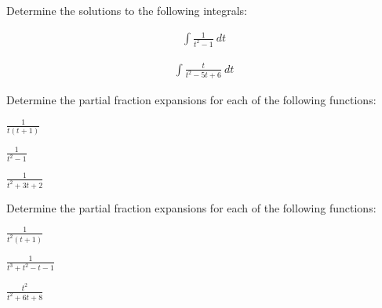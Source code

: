 

\begin{problem}
\item Determine the solutions to the following integrals:

  \begin{subproblem}
  \item 
    \begin{eqnarray*}
      \int \frac{1}{t^2-1} ~ dt 
    \end{eqnarray*}
    \vfill

  \item 
    \begin{eqnarray*}
      \int \frac{t}{t^2-5t+6} ~ dt
    \end{eqnarray*}
    \vfill

  \end{subproblem}
\end{problem}


\begin{problem}
\item Determine the partial fraction expansions for each of the following functions:

  \begin{subproblem}
  \item $\frac{1}{t(t+1)}$
    \vfill
  \item $\frac{1}{t^2-1}$
    \vfill
  \item $\frac{1}{t^2+3t+2}$
    \vfill
  \end{subproblem}


  \clearpage
\item Determine the partial fraction expansions for each of the following functions:

  \begin{subproblem}
  \item $\frac{1}{t^2(t+1)}$
    \vfill
  \item $\frac{1}{t^3+t^2-t-1}$
    \vfill
  \item $\frac{t^2}{t^2+6t+8}$
    \vfill
  \end{subproblem}


\end{problem}


